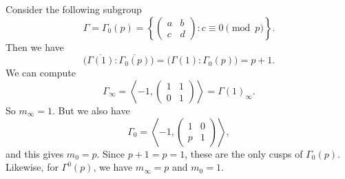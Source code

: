 \documentclass[a4paper]{article}
\begin{document}
\begin{eg}
  Consider the following subgroup
  \[
    \Gamma = \Gamma_0(p) =\left\{
      \begin{pmatrix}
        a & b\\
        c & d
      \end{pmatrix} : c \equiv 0 \pmod p
    \right\}.
  \]
  Then we have
  \[
    \big(\overline{\Gamma(1)}: \overline{\Gamma_0(p)}\big) = \big(\Gamma(1): \Gamma_0(p)\big) = p + 1.
  \]
  We can compute
  \[
    \Gamma_\infty = \left\langle -1,
    \begin{pmatrix}
      1 & 1\\
      0 & 1
    \end{pmatrix}\right\rangle = \Gamma(1)_\infty.
  \]
  So $m_\infty = 1$. But we also have
  \[
    \Gamma_0 = \left\langle -1,
    \begin{pmatrix}
      1 & 0\\
      p & 1
    \end{pmatrix}\right\rangle,
  \]
  and this gives $m_0 = p$. Since $p + 1 = p = 1$, these are the only cusps of $\Gamma_0(p)$. Likewise, for $\Gamma^0(p)$, we have $m_\infty = p$ and $m_0 = 1$.
%
%
%
%
%
%
\end{eg}
\end{document}
